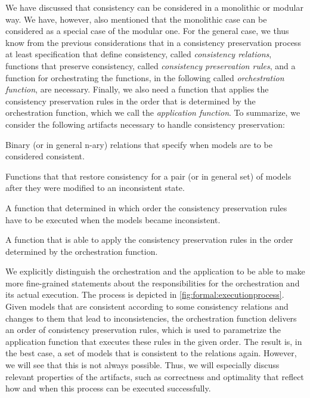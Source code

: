 We have discussed that consistency can be considered in a monolithic or modular way. We have, however, also mentioned that the monolithic case can be considered as a special case of the modular one.
For the general case, we thus know from the previous considerations that in a consistency preservation process at least specification that define consistency, called \emph{\glspl{consistency relation}}, functions that preserve consistency, called \emph{\glspl{consistency preservation rule}}, and a function for orchestrating the functions, in the following called \emph{\gls{orchestration function}}, are necessary. Finally, we also need a function that applies the \glspl{consistency preservation rule} in the order that is determined by the orchestration function, which we call the \emph{\gls{application function}}.
To summarize, we consider the following artifacts necessary to handle consistency preservation:
\begin{properdescription}
    \item[\Glspl{consistency relation}:] Binary (or in general n-ary) relations that specify when models are to be considered consistent.
    \item[\Glspl{consistency preservation rule}:] Functions that that restore consistency for a pair (or in general set) of models after they were modified to an inconsistent state.
    \item[\Gls{orchestration function}:] A function that determined in which order the consistency preservation rules have to be executed when the models became inconsistent.
    \item[\Gls{application function}:] A function that is able to apply the consistency preservation rules in the order determined by the orchestration function. 
\end{properdescription}

We explicitly distinguish the orchestration and the application to be able to make more fine-grained statements about the responsibilities for the orchestration and its actual execution.
The process is depicted in \autoref{fig:formal:executionprocess}. Given models that are consistent according to some consistency relations and changes to them that lead to inconsistencies, the orchestration function delivers an order of consistency preservation rules, which is used to parametrize the application function that executes these rules in the given order.
The result is, in the best case, a set of models that is consistent to the relations again.
However, we will see that this is not always possible. Thus, we will especially discuss relevant properties of the artifacts, such as correctness and optimality that reflect how and when this process can be executed successfully.

